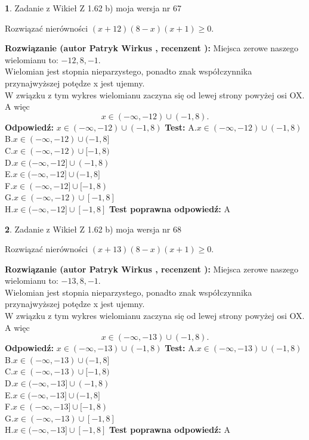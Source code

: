 \documentclass[12pt, a4paper]{article}
\theoremstyle{definition} %
\newtheorem{zad}{}
\newcommand{\zadStart}[1]{\begin{zad}#1\newline}
\newcommand{\zadStop}{\end{zad}}
\newcommand{\rozwStart}[2]{\noindent \textbf{Rozwiązanie (autor #1 , recenzent #2): }\newline}
\newcommand{\rozwStop}{\newline}
\newcommand{\odpStart}{\noindent \textbf{Odpowiedź:}\newline}
\newcommand{\odpStop}{\newline}
\newcommand{\testStart}{\noindent \textbf{Test:}\newline}
\newcommand{\testStop}{\newline}
\newcommand{\kluczStart}{\noindent \textbf{Test poprawna odpowiedź:}\newline}
\newcommand{\kluczStop}{\newline}
\begin{document}
\zadStart{Zadanie z Wikieł Z 1.62 b) moja wersja nr 67}

Rozwiązać nierówności $(x+12)(8-x)(x+1)\ge0$.
\zadStop
\rozwStart{Patryk Wirkus}{}
Miejsca zerowe naszego wielomianu to: $-12, 8, -1$.\\
Wielomian jest stopnia nieparzystego, ponadto znak współczynnika przy\linebreak najwyższej potędze x jest ujemny.\\ W związku z tym wykres wielomianu zaczyna się od lewej strony powyżej osi OX. A więc $$x \in (-\infty,-12) \cup (-1,8).$$
\rozwStop
\odpStart
$x \in (-\infty,-12) \cup (-1,8)$
\odpStop
\testStart
A.$x \in (-\infty,-12) \cup (-1,8)$\\
B.$x \in (-\infty,-12) \cup (-1,8]$\\
C.$x \in (-\infty,-12) \cup [-1,8)$\\
D.$x \in (-\infty,-12] \cup (-1,8)$\\
E.$x \in (-\infty,-12] \cup (-1,8]$\\
F.$x \in (-\infty,-12] \cup [-1,8)$\\
G.$x \in (-\infty,-12) \cup [-1,8]$\\
H.$x \in (-\infty,-12] \cup [-1,8]$
\testStop
\kluczStart
A
\kluczStop



\zadStart{Zadanie z Wikieł Z 1.62 b) moja wersja nr 68}

Rozwiązać nierówności $(x+13)(8-x)(x+1)\ge0$.
\zadStop
\rozwStart{Patryk Wirkus}{}
Miejsca zerowe naszego wielomianu to: $-13, 8, -1$.\\
Wielomian jest stopnia nieparzystego, ponadto znak współczynnika przy\linebreak najwyższej potędze x jest ujemny.\\ W związku z tym wykres wielomianu zaczyna się od lewej strony powyżej osi OX. A więc $$x \in (-\infty,-13) \cup (-1,8).$$
\rozwStop
\odpStart
$x \in (-\infty,-13) \cup (-1,8)$
\odpStop
\testStart
A.$x \in (-\infty,-13) \cup (-1,8)$\\
B.$x \in (-\infty,-13) \cup (-1,8]$\\
C.$x \in (-\infty,-13) \cup [-1,8)$\\
D.$x \in (-\infty,-13] \cup (-1,8)$\\
E.$x \in (-\infty,-13] \cup (-1,8]$\\
F.$x \in (-\infty,-13] \cup [-1,8)$\\
G.$x \in (-\infty,-13) \cup [-1,8]$\\
H.$x \in (-\infty,-13] \cup [-1,8]$
\testStop
\kluczStart
A
\kluczStop
\end{document}
